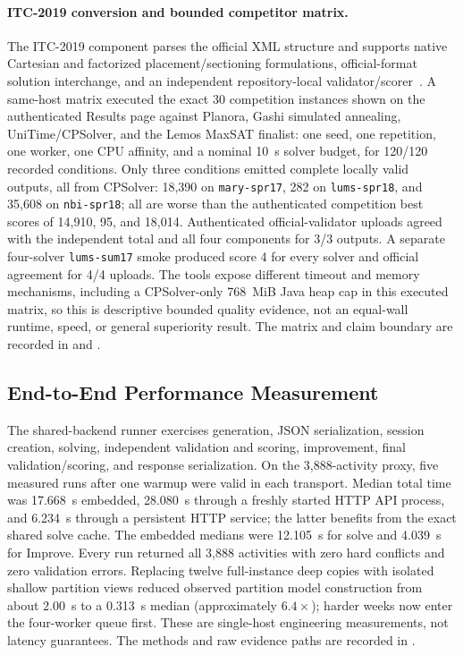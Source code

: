 \paragraph{ITC-2019 conversion and bounded competitor matrix.}
The ITC-2019 component parses the official XML structure and supports native Cartesian and factorized placement/sectioning formulations, official-format solution interchange, and an independent repository-local validator/scorer~\cite{itc2019official,itc2019format,muller2025itc2019}.
A same-host matrix executed the exact 30 competition instances shown on the authenticated Results page against Planora, Gashi simulated annealing, UniTime/CPSolver, and the Lemos MaxSAT finalist: one seed, one repetition, one worker, one CPU affinity, and a nominal 10~s solver budget, for 120/120 recorded conditions.
Only three conditions emitted complete locally valid outputs, all from CPSolver: 18,390 on \texttt{mary-spr17}, 282 on \texttt{lums-spr18}, and 35,608 on \texttt{nbi-spr18}; all are worse than the authenticated competition best scores of 14,910, 95, and 18,014.
Authenticated official-validator uploads agreed with the independent total and all four components for 3/3 outputs.
A separate four-solver \texttt{lums-sum17} smoke produced score 4 for every solver and official agreement for 4/4 uploads.
The tools expose different timeout and memory mechanisms, including a CPSolver-only 768~MiB Java heap cap in this executed matrix, so this is descriptive bounded quality evidence, not an equal-wall runtime, speed, or general superiority result.
The matrix and claim boundary are recorded in  and .

\subsection{End-to-End Performance Measurement}
The shared-backend runner exercises generation, JSON serialization, session creation, solving, independent validation and scoring, improvement, final validation/scoring, and response serialization.
On the 3,888-activity proxy, five measured runs after one warmup were valid in each transport. Median total time was 17.668~s embedded, 28.080~s through a freshly started HTTP API process, and 6.234~s through a persistent HTTP service; the latter benefits from the exact shared solve cache.
The embedded medians were 12.105~s for solve and 4.039~s for Improve. Every run returned all 3,888 activities with zero hard conflicts and zero validation errors.
Replacing twelve full-instance deep copies with isolated shallow partition views reduced observed partition model construction from about 2.00~s to a 0.313~s median (approximately $6.4\times$); harder weeks now enter the four-worker queue first.
These are single-host engineering measurements, not latency guarantees. The methods and raw evidence paths are recorded in .


